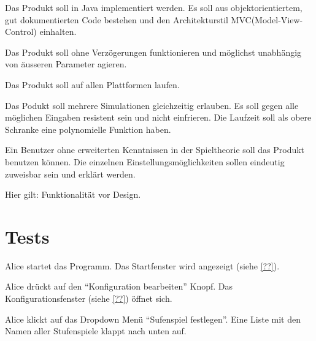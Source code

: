 \documentclass[parskip=full,11pt]{scrartcl}
\begin{document}

Das Produkt soll in Java implementiert werden. Es soll aus objektorientiertem, gut dokumentierten Code bestehen und den Architekturstil MVC(Model-View-Control) einhalten.


Das Produkt soll ohne Verzögerungen funktionieren und möglichst unabhängig von äusseren Parameter agieren.


Das Produkt soll auf allen Plattformen laufen.


Das Podukt soll mehrere Simulationen gleichzeitig erlauben. Es soll gegen alle möglichen Eingaben resistent sein und nicht einfrieren.
Die Laufzeit soll als obere Schranke eine polynomielle Funktion haben.


Ein Benutzer ohne erweiterten Kenntnissen in der Spieltheorie soll das Produkt benutzen können.
Die einzelnen Einstellungsmöglichkeiten sollen eindeutig zuweisbar sein und erklärt werden. 

Hier gilt: Funktionalität vor Design. 

\section{Tests}


{Alice startet das Programm.}
{Das Startfenster wird angezeigt (siehe \cref{??}).}

{Alice drückt auf den \enquote{Konfiguration bearbeiten} Knopf.}%
{Das Konfigurationsfenster (siehe \cref{??}) öffnet sich.}

{Alice klickt auf das Dropdown Menü \enquote{Sufenspiel festlegen}.}%
{Eine Liste mit den Namen aller Stufenspiele klappt nach unten auf.}
\end{document}
